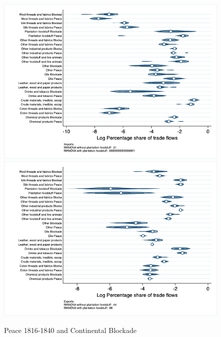 \documentclass[12pt,a4paper,notitlepage,english]{article}
\begin{document}
\begin{figure}
\centering
\caption{Peace 1816-1840 and Continental Blockade}
\label{peace1816_1840_block_nat_distr_sitc}
\includegraphics[scale=.4]{peace1816_1840_block_nat_distr_Isitc}
\includegraphics[scale=.4]{peace1816_1840_block_nat_distr_Xsitc}
\end{figure}
\end{document}

